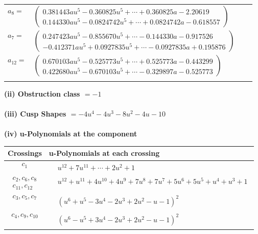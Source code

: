 \documentclass[1p]{elsarticle_modified}
\theoremstyle{definition}
\begin{document}
\begin{tabular}{m{7pt} m{180pt} m{7pt} m{180pt} }
\flushright $a_{8}=$&$\begin{pmatrix}0.381443 a u^{5}-0.360825 u^{5}+\cdots+0.360825 a-2.20619\\0.144330 a u^{5}-0.0824742 u^{5}+\cdots+0.0824742 a-0.618557\end{pmatrix}$ \\
\flushright $a_{7}=$&$\begin{pmatrix}0.247423 a u^{5}-0.855670 u^{5}+\cdots-0.144330 a-0.917526\\-0.412371 a u^{5}+0.0927835 u^{5}+\cdots-0.0927835 a+0.195876\end{pmatrix}$ \\
\flushright $a_{12}=$&$\begin{pmatrix}0.670103 a u^{5}-0.525773 u^{5}+\cdots+0.525773 a-0.443299\\0.422680 a u^{5}-0.670103 u^{5}+\cdots-0.329897 a-0.525773\end{pmatrix}$\\&\end{tabular}
\flushleft \textbf{(ii) Obstruction class $= -1$}\\~\\
\flushleft \textbf{(iii) Cusp Shapes $= -4 u^4-4 u^3-8 u^2-4 u-10$}\\~\\
\newpage\renewcommand{\arraystretch}{1}
\flushleft \textbf{(iv) u-Polynomials at the component}\newline \\
\begin{tabular}{m{50pt}|m{274pt}}
Crossings & \hspace{64pt}u-Polynomials at each crossing \\
\hline $$\begin{aligned}c_{1}\end{aligned}$$&$\begin{aligned}
&u^{12}+7 u^{11}+\cdots+2 u^2+1
\end{aligned}$\\
\hline $$\begin{aligned}c_{2},c_{6},c_{8}\\c_{11},c_{12}\end{aligned}$$&$\begin{aligned}
&u^{12}+u^{11}+4 u^{10}+4 u^9+7 u^8+7 u^7+5 u^6+5 u^5+u^4+u^3+1
\end{aligned}$\\
\hline $$\begin{aligned}c_{3},c_{5},c_{7}\end{aligned}$$&$\begin{aligned}
&(u^6+u^5-3 u^4-2 u^3+2 u^2- u-1)^2
\end{aligned}$\\
\hline $$\begin{aligned}c_{4},c_{9},c_{10}\end{aligned}$$&$\begin{aligned}
&(u^6- u^5+3 u^4-2 u^3+2 u^2- u-1)^2
\end{aligned}$\\
\hline
\end{tabular}\\~\\
\end{document}
